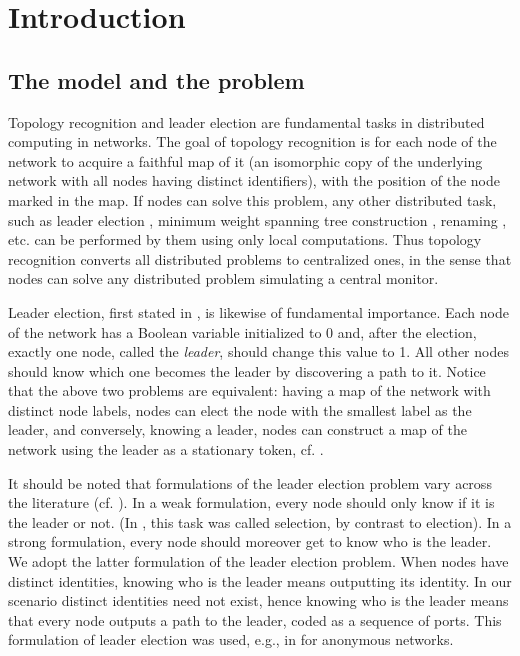 \documentclass[a4paper,10pt]{article}
\begin{document}
\section{Introduction} \label{sec:intro}

\subsection{The model and the problem} \label{subsec:model}

Topology recognition and leader election are fundamental tasks in distributed computing in  networks. The goal of topology recognition is for each node of the network to acquire a faithful map of it (an isomorphic
copy of the underlying network with all nodes having distinct identifiers), with the position of the node marked in the map. If nodes can solve this problem, any other 
distributed task, such as leader election \cite{HS,P}, minimum weight spanning tree construction \cite{A}, 
renaming \cite{ABDKPR}, etc. can be performed by them using
only local computations. Thus topology recognition converts all distributed problems to centralized ones, 
in the sense that nodes can solve any distributed problem simulating a central monitor.

Leader election, first stated in \cite{LL}, is likewise of fundamental importance.
Each node of the network has a Boolean variable initialized to 0 and, after the election, exactly one node,
called the {\em leader}, should change this value to 1. All other nodes should know which one becomes the leader by discovering a path to it.
Notice that the above two problems are equivalent: having a map of the network with distinct node labels, nodes can elect the node with the smallest
label as the leader, and conversely, knowing a leader, nodes can construct a map of the network using the leader as a stationary token, cf. \cite{CDK}.

It should be noted that formulations of the leader election problem vary across the literature (cf. \cite{Ly}). In a weak formulation, every node should only know if it is the leader or not. (In \cite{MP}, this task was called selection, by contrast to election). In a strong formulation, every node should moreover get to know who is the leader. We adopt the latter formulation of the leader election problem. When nodes have distinct identities, knowing who is the leader means outputting its identity. In our scenario distinct identities need not exist, hence knowing who is the leader means that every node outputs a path to the leader, coded as a sequence of ports. This formulation of leader election was used, e.g., in \cite{GMP} for anonymous networks.   
\end{document}
